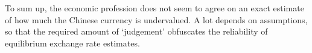 To sum up, the economic profession does not seem to agree on an exact estimate of how much the Chinese currency is undervalued. A lot depends on assumptions, so that the required amount of `judgement' obfuscates the reliability of equilibrium exchange rate estimates. 
 
 








